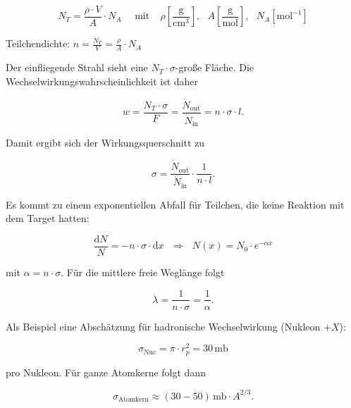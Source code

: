 \begin{figure}[H]
		\centering
		
\end{figure}


\[ N_T = \frac{\rho\cdot V}{A}\cdot N_A~~~~~~ \text{mit}~~~~~ \rho
\left[\frac{\text{g}}{\text{cm}^3} \right],~~~A\left[\frac{\text{g}}{\text{mol}} \right],~~~N_A\left[\text{mol}^{-1} \right] \] 

Teilchendichte: $n=\frac{N_T}{V}=\frac{\rho}{A}\cdot N_A$

Der einfliegende Strahl sieht eine $N_T\cdot\sigma$-große Fläche. Die
Wechselwirkungswahrscheinlichkeit ist daher

\[w= \frac{N_T\cdot\sigma}{F} = \frac{\dot{N}_\text{out}}{\dot{N}_\text{in}} = n\cdot \sigma \cdot
l. \]

Damit ergibt sich der Wirkungsquerschnitt zu 

\[\sigma =\frac{\dot{N}_\text{out}}{\dot{N}_\text{in}}\cdot \frac{1}{n\cdot l} . \]

Es kommt zu einem exponentiellen Abfall für Teilchen, die keine Reaktion mit dem Target hatten:

\[\frac{\mathrm{d}N}{N} = -n\cdot \sigma\cdot \mathrm{d} x ~~~\Rightarrow~~~ N(x)=N_0\cdot
e^{-\alpha x}
\]

mit $\alpha=n\cdot \sigma$. Für die mittlere freie Weglänge folgt

\[\lambda =\frac{1}{n\cdot\sigma}=\frac{1}{\alpha}.  \]

Als Beispiel eine Abschätzung für hadronische Wechselwirkung (Nukleon $+X$):

\[\sigma_\text{Nuc} = \pi\cdot r_p^2 = 30\,\text{mb} \]

pro Nukleon. Für ganze Atomkerne folgt dann

\[\sigma_\text{Atomkern} \approx (30-50)\,\text{mb}\cdot A^{2/3}.\]
